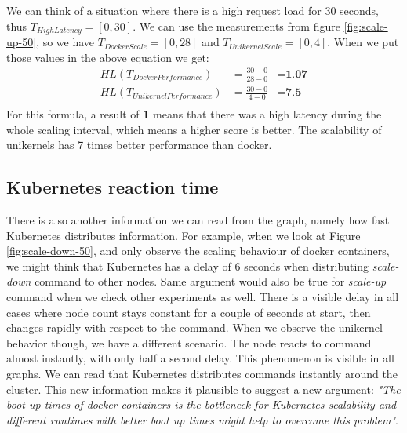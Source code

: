 We can think of a situation where there is a high request load for 30 seconds, thus \(T_{HighLatency}=[0,30]\). We can use the measurements from figure \ref{fig:scale-up-50}, so we have \(T_{DockerScale}=[0,28]\) and \(T_{UnikernelScale}=[0,4]\). When we put those values in the above equation we get:
\begin{equation*}
  \begin{aligned}
  HL(T_{DockerPerformance})&=\frac{30-0}{28-0}&=\textbf{1.07} \\
  HL(T_{UnikernelPerformance})&=\frac{30-0}{4-0}&=\textbf{7.5} \\
  \end{aligned}
\end{equation*}
For this formula, a result of \textbf{1} means that there was a high latency during the whole scaling interval, which means a higher score is better. The scalability of unikernels has 7 times better performance than docker.


\subsection{Kubernetes reaction time}
There is also another information we can read from the graph, namely how fast Kubernetes distributes information. For example, when we look at Figure \ref{fig:scale-down-50}, and only observe the scaling behaviour of docker containers, we might think that Kubernetes has a delay of 6 seconds when distributing \textit{scale-down} command to other nodes. Same argument would also be true for \textit{scale-up} command when we check other experiments as well. There is a visible delay in all cases where node count stays constant for a couple of seconds at start, then changes rapidly with respect to the command. When we observe the unikernel behavior though, we have a different scenario. The node reacts to command almost instantly, with only half a second delay. This phenomenon is visible in all graphs. We can read that Kubernetes distributes commands instantly around the cluster. This new information makes it plausible to suggest a new argument: \textit{"The boot-up times of docker containers is the bottleneck for Kubernetes scalability and different runtimes with better boot up times might help to overcome this problem"}.


  
